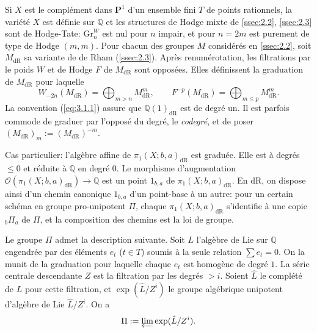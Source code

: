 \documentclass[11pt,a4paper]{article}
\theoremstyle{plain}
\theoremstyle{definition}
\newcommand{\Q}{\mathbb{Q}}
\newcommand{\dR}{\mathrm{dR}}
\newcommand{\Gr}{\mathrm{Gr}}
\begin{document}
Si $X$ est le compl\'ement dans $\mathbf{P}^1$ d'un ensemble fini $T$ de points rationnels, la vari\'et\'e $X$ est d\'efinie sur $\Q$ et les structures de Hodge mixte de \ref{ssec:2.2}, \ref{ssec:2.3} sont de Hodge-Tate: $\Gr_n^W$ est nul pour $n$ impair, et pour $n = 2m$ est purement de type de Hodge $(m,m)$. Pour chacun des groupes $M$ consid\'er\'es en \ref{ssec:2.2}, soit $M_{\dR}$ sa variante de de Rham (\ref{ssec:2.3}). Apr\`es renum\'erotation, les filtrations par le poids $W$ et de Hodge $F$ de $M_{\dR}$ sont oppos\'ees. Elles d\'efinissent la graduation de $M_{\dR}$ pour laquelle
\begin{equation}\label{eq:3.1.1}
W_{-2n}(M_{\dR}) = \bigoplus_{m>n} M_{\dR}^m, \qquad F^{-p}(M_{\dR}) = \bigoplus_{m \leq p} M_{\dR}^m.
\end{equation}
La convention (\ref{eq:3.1.1}) assure que $\Q(1)_{\dR}$ est de degr\'e un. Il est parfois commode de graduer par l'oppos\'e du degr\'e, le \emph{codegr\'e}, et de poser $(M_{\dR})_m := (M_{\dR})^{-m}$.

Cas particulier: l'alg\`ebre affine de $\pi_1(X;b,a)_{\dR}$ est gradu\'ee. Elle est \`a degr\'es $\leq 0$ et r\'eduite \`a $\Q$ en degr\'e $0$. Le morphisme d'augmentation $\mathcal{O}(\pi_1(X;b,a)_{\dR}) \to \Q$ est un point $1_{b,a}$ de $\pi_1(X;b,a)_{\dR}$. En $\dR$, on dispose ainsi d'un chemin canonique $1_{b,a}$ d'un point-base \`a un autre: pour un certain sch\'ema en groupe pro-unipotent $\Pi$, chaque $\pi_1(X;b,a)_{\dR}$ s'identifie \`a une copie ${}_b\Pi_a$ de $\Pi$, et la composition des chemins est la loi de groupe.

Le groupe $\Pi$ admet la description suivante. Soit $L$ l'alg\`ebre de Lie sur $\Q$ engendr\'ee par des \'el\'ements $e_t$ ($t \in T$) soumis \`a la seule relation $\sum e_t = 0$. On la munit de la graduation pour laquelle chaque $e_t$ est homog\`ene de degr\'e $1$. La s\'erie centrale descendante $Z$ est la filtration par les degr\'es $> i$. Soient $\hat{L}$ le compl\'et\'e de $L$ pour cette filtration, et $\exp(\hat{L}/Z^i)$ le groupe alg\'ebrique unipotent d'alg\`ebre de Lie $\hat{L}/Z^i$. On a
\begin{equation}\label{eq:3.1.2}
\Pi := \varprojlim \exp(\hat{L}/Z^i).
\end{equation}
\end{document}
